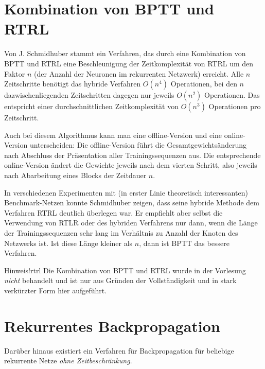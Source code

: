 \section*{Kombination von BPTT und RTRL}
Von J. Schmidhuber stammt ein Verfahren, das durch eine Kombination von BPTT und RTRL eine Beschleunigung der Zeitkomplexität von RTRL um den Faktor $n$ (der Anzahl der Neuronen im rekurrenten Netzwerk) erreicht.
Alle $n$ Zeitschritte benötigt das hybride Verfahren $O(n^4)$ Operationen, bei den $n$ dazwischenliegenden Zeitschritten dagegen nur jeweils $O(n^2)$ Operationen. Das entspricht einer durchschnittlichen Zeitkomplexität von $O(n^3)$ Operationen pro Zeitschritt.

Auch bei diesem Algorithmus kann man eine offline-Version und eine online- Version unterscheiden: Die offline-Version führt die Gesamtgewichtsänderung nach Abschluss der Präsentation aller Trainingssequenzen aus.
Die entsprechende online-Version ändert die Gewichte jeweils nach dem vierten Schritt, also jeweils nach Abarbeitung eines Blocks der Zeitdauer $n$.

In verschiedenen Experimenten mit (in erster Linie theoretisch interessanten) Benchmark-Netzen konnte Schmidhuber zeigen, dass seine hybride Methode dem Verfahren RTRL deutlich überlegen war.
Er empfiehlt aber selbst die Verwendung von RTLR oder des hybriden Verfahrens nur dann, wenn die Länge der Trainingssequenzen sehr lang im Verhältnis zu Anzahl der Knoten des Netzwerks ist. 
Ist diese Länge kleiner als $n$, dann ist BPTT das bessere Verfahren.

\begin{hint}{Hinweis!}{rtrl}
	Die Kombination von BPTT und RTRL wurde in der Vorlesung \emph{nicht} behandelt und ist nur aus Gründen der Vollständigkeit und in stark verkürzter Form hier aufgeführt.
\end{hint}


\section*{Rekurrentes Backpropagation}
Darüber hinaus existiert ein Verfahren für Backpropagation für beliebige rekurrente Netze \emph{ohne Zeitbeschränkung}.

